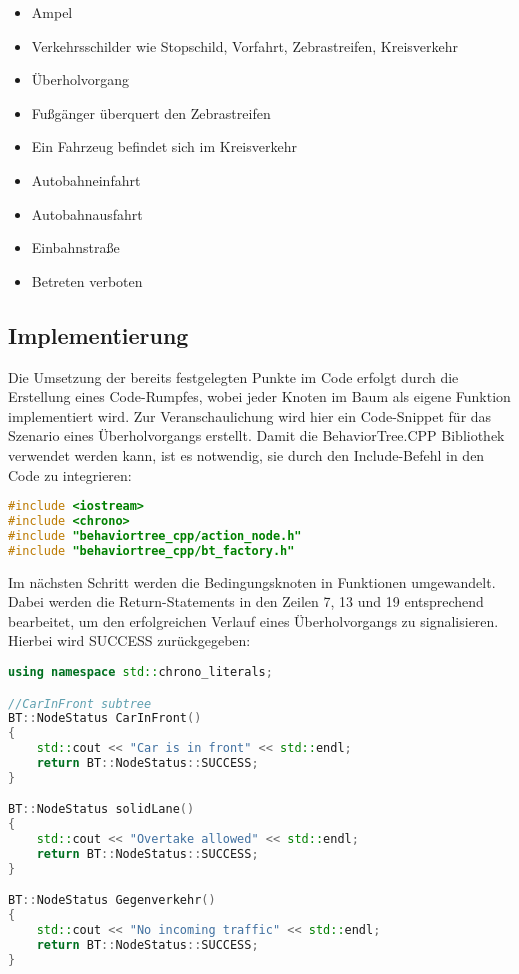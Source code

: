 \begin{itemize}
    \item Ampel
    \item Verkehrsschilder wie Stopschild, Vorfahrt, Zebrastreifen, Kreisverkehr
    \item Überholvorgang
    \item Fußgänger überquert den Zebrastreifen
    \item Ein Fahrzeug befindet sich im Kreisverkehr
    \item Autobahneinfahrt
    \item Autobahnausfahrt
    \item Einbahnstraße
    \item Betreten verboten
\end{itemize}

\newpage
\subsection{Implementierung}

Die Umsetzung der bereits festgelegten Punkte im Code erfolgt durch die Erstellung eines Code-Rumpfes, wobei jeder Knoten im Baum als eigene Funktion implementiert wird. Zur Veranschaulichung wird hier ein Code-Snippet für das Szenario eines Überholvorgangs erstellt. Damit die BehaviorTree.CPP Bibliothek verwendet werden kann, ist es notwendig, sie durch den Include-Befehl in den Code zu integrieren:

\begin{lstlisting}[language=C++, caption={Import der Bibliothek}]
#include <iostream>
#include <chrono>
#include "behaviortree_cpp/action_node.h"
#include "behaviortree_cpp/bt_factory.h"

\end{lstlisting}

Im nächsten Schritt werden die Bedingungsknoten in Funktionen umgewandelt. Dabei werden die Return-Statements in den Zeilen 7, 13 und 19 entsprechend bearbeitet, um den erfolgreichen Verlauf eines Überholvorgangs zu signalisieren. Hierbei wird SUCCESS zurückgegeben:

\begin{lstlisting}[language=C++, caption={Bedingungsknoten}]
using namespace std::chrono_literals;

//CarInFront subtree
BT::NodeStatus CarInFront()
{
    std::cout << "Car is in front" << std::endl;
    return BT::NodeStatus::SUCCESS;
}

BT::NodeStatus solidLane()
{
    std::cout << "Overtake allowed" << std::endl;
    return BT::NodeStatus::SUCCESS;
}

BT::NodeStatus Gegenverkehr()
{
    std::cout << "No incoming traffic" << std::endl;
    return BT::NodeStatus::SUCCESS;
}
\end{lstlisting}

